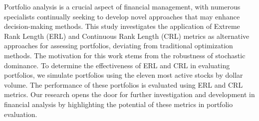 
\begin{Abstrakt}
    Portfolio analysis is a crucial aspect of financial management, with numerous specialists continually seeking to develop novel approaches that may enhance decision-making methods. This study investigates the application of Extreme Rank Length (ERL) and Continuous Rank Length (CRL) metrics as alternative approaches for assessing portfolios, deviating from traditional optimization methods. The motivation for this work stems from the robustness of stochastic dominance. To determine the effectiveness of ERL and CRL in evaluating portfolios, we simulate portfolios using the eleven most active stocks by dollar volume. The performance of these portfolios is evaluated using ERL and CRL metrics. Our research opens the door for further investigation and development in financial analysis by highlighting the potential of these metrics in portfolio evaluation.
\end{Abstrakt}



\clearpage